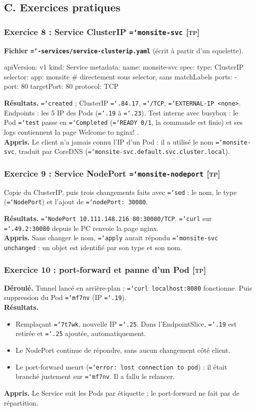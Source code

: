 \documentclass[11pt,a4paper]{article}
\newcommand{\cmd}[1]{\texttt{\hyphenchar\font=`\-#1}}
\newcommand{\tp}{\textsc{[tp]}}
\newcommand{\partie}[1]{\needspace{9\baselineskip}\subsection*{#1}}
\newcommand{\exo}[1]{\needspace{8\baselineskip}\subsubsection*{#1}}
\begin{document}
\partie{C. Exercices pratiques}
\exo{Exercice 8 : Service ClusterIP \cmd{monsite-svc} \tp}
\textbf{Fichier \cmd{06-services/service-clusterip.yaml}} (écrit à partir d'un squelette).
\begin{code}
apiVersion: v1
kind: Service
metadata:
  name: monsite-svc
spec:
  type: ClusterIP
  selector:
    app: monsite         # directement sous selector, sans matchLabels
  ports:
    - port: 80
      targetPort: 80
      protocol: TCP
\end{code}
\textbf{Résultats.} \cmd{created} ; ClusterIP \cmd{10.109.84.17}, \cmd{80/TCP}, \cmd{EXTERNAL-IP <none>}. Endpoints : les 5 IP des Pods (\cmd{.19} à \cmd{.23}).
Test interne avec busybox : le Pod \cmd{test} passe en \cmd{Completed} (\cmd{READY 0/1}, la commande est finie) et ses logs contiennent la page \og Welcome to nginx! \fg.\\
\textbf{Appris.} Le client n'a jamais connu l'IP d'un Pod : il a utilisé le nom \cmd{monsite-svc}, traduit par CoreDNS (\cmd{monsite-svc.default.svc.cluster.local}).

\exo{Exercice 9 : Service NodePort \cmd{monsite-nodeport} \tp}
Copie du ClusterIP, puis trois changements faits avec \cmd{sed} : le nom, le type (\cmd{NodePort}) et l'ajout de \cmd{nodePort: 30080}.
\textbf{Résultats.} \cmd{NodePort 10.111.148.216 80:30080/TCP}. \cmd{curl} sur \cmd{192.168.49.2:30080} depuis le PC renvoie la page nginx.\\
\textbf{Appris.} Sans changer le nom, \cmd{apply} aurait répondu \cmd{monsite-svc unchanged} : un objet est identifié par son type et son nom.

\exo{Exercice 10 : port-forward et panne d'un Pod \tp}
\textbf{Déroulé.} Tunnel lancé en arrière-plan ; \cmd{curl localhost:8080} fonctionne. Puis suppression du Pod \cmd{mf7nv} (IP \cmd{.19}).\\
\textbf{Résultats.}
\begin{itemize}
  \item Remplaçant \cmd{7t7wk}, nouvelle IP \cmd{.25}. Dans l'EndpointSlice, \cmd{.19} est retirée et \cmd{.25} ajoutée, automatiquement.
  \item Le NodePort continue de répondre, sans aucun changement côté client.
  \item Le port-forward meurt (\cmd{error: lost connection to pod}) : il était branché justement sur \cmd{mf7nv}. Il a fallu le relancer.
\end{itemize}
\textbf{Appris.} Le Service suit les Pods par étiquette ; le port-forward ne fait pas de répartition.
\end{document}

